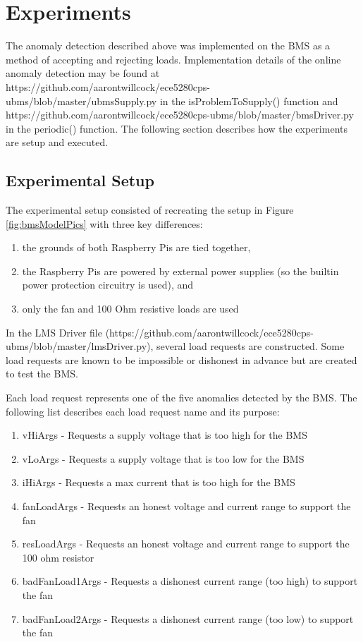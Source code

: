 \documentclass[11pt,conference,draftcls,onecolumn]{IEEEtran}
\begin{document}
\section{Experiments}\label{sec:experiments}
The anomaly detection described above was implemented on the BMS as a method of accepting and rejecting loads.
Implementation details of the online anomaly detection may be found at https://github.com/aarontwillcock/ece5280cps-ubms/blob/master/ubmsSupply.py in the isProblemToSupply() function and https://github.com/aarontwillcock/ece5280cps-ubms/blob/master/bmsDriver.py in the periodic() function.  
The following section describes how the experiments are setup and executed.

\subsection{Experimental Setup}
The experimental setup consisted of recreating the setup in Figure \ref{fig:bmsModelPics} with three key differences:
\begin{enumerate}
    \item the grounds of both Raspberry Pis are tied together,
    \item the Raspberry Pis are powered by external power supplies (so the builtin power protection circuitry is used), and
    \item only the fan and 100 Ohm resistive loads are used
\end{enumerate}

In the LMS Driver file (https://github.com/aarontwillcock/ece5280cps-ubms/blob/master/lmsDriver.py), several load requests are constructed.
Some load requests are known to be impossible or dishonest in advance but are created to test the BMS.

Each load request represents one of the five anomalies detected by the BMS.
The following list describes each load request name and its purpose:
\begin{enumerate}
    \item vHiArgs - Requests a supply voltage that is too high for the BMS
    \item vLoArgs - Requests a supply voltage that is too low for the BMS
    \item iHiArgs - Requests a max current that is too high for the BMS
    \item fanLoadArgs - Requests an honest voltage and current range to support the fan
    \item resLoadArgs - Requests an honest voltage and current range to support the 100 ohm resistor
    \item badFanLoad1Args - Requests a dishonest current range (too high) to support the fan
    \item badFanLoad2Args - Requests a dishonest current range (too low) to support the fan
\end{enumerate}
\end{document}
